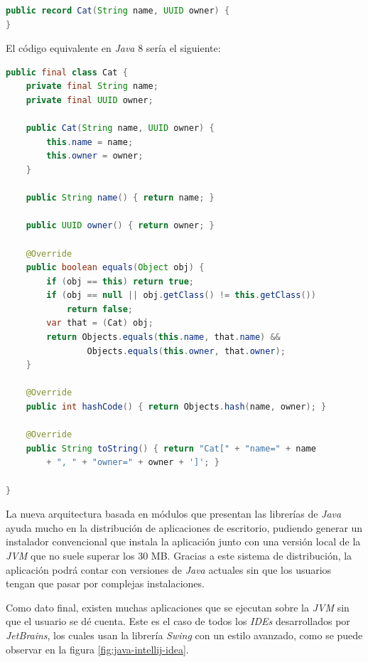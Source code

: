 \begin{lstlisting}[language=Java,style=java,frame=single,label={lst:java-comparacion-18}]
public record Cat(String name, UUID owner) {
}
\end{lstlisting}

El código equivalente en \textit{Java} 8 sería el siguiente:

\begin{lstlisting}[language=Java,style=java,frame=single,label={lst:java-comparacion-8}]
public final class Cat {
    private final String name;
    private final UUID owner;

    public Cat(String name, UUID owner) {
        this.name = name;
        this.owner = owner;
    }

    public String name() { return name; }

    public UUID owner() { return owner; }

    @Override
    public boolean equals(Object obj) {
        if (obj == this) return true;
        if (obj == null || obj.getClass() != this.getClass())
            return false;
        var that = (Cat) obj;
        return Objects.equals(this.name, that.name) &&
                Objects.equals(this.owner, that.owner);
    }

    @Override
    public int hashCode() { return Objects.hash(name, owner); }

    @Override
    public String toString() { return "Cat[" + "name=" + name
        + ", " + "owner=" + owner + ']'; }

}
\end{lstlisting}

La nueva arquitectura basada en módulos que presentan las librerías de \textit{Java}
ayuda mucho en la distribución de aplicaciones de escritorio, pudiendo generar un instalador
convencional que instala la aplicación junto con una versión local de la \textit{JVM} que no
suele superar los 30 MB\cite{JPACKAGE}.
Gracias a este sistema de distribución, la aplicación podrá contar con versiones
de \textit{Java} actuales sin que los usuarios tengan que pasar por complejas instalaciones.

Como dato final, existen muchas aplicaciones que se ejecutan sobre la \textit{JVM}
sin que el usuario se dé cuenta.
Este es el caso de todos los \textit{IDEs} desarrollados por \textit{JetBrains}, los cuales
usan la librería \textit{Swing} con un estilo avanzado, como se puede observar en la figura
\ref{fig:java-intellij-idea}.

